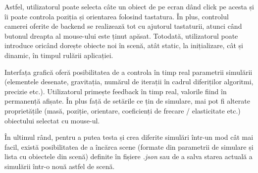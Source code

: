\documentclass[12pt,a4paper]{report}
\begin{document}
Astfel, utilizatorul poate selecta câte un obiect de pe ecran dând click pe acesta și îi poate controla poziția și orientarea folosind tastatura. În plus, controlul camerei oferite de backend se realizează tot cu ajutorul tastaturii, atunci când butonul dreapta al mouse-ului este ținut apăsat. Totodată, utilizatorul poate introduce oricând dorește obiecte noi în scenă, atât static, la inițializare, cât și dinamic, în timpul rulării aplicației.

Interfața grafică oferă posibilitatea de a controla în timp real parametrii simulării (elementele desenate, gravitația, numărul de iterații în cadrul diferiților algoritmi, precizie etc.). Utilizatorul primește feedback în timp real, valorile fiind în permanență afișate. În plus față de setările ce țin de simulare, mai pot fi alterate proprietățile (masă, poziție, orientare, coeficienți de frecare / elasticitate etc.) obiectului selectat cu mouse-ul.

În ultimul rând, pentru a putea testa și crea diferite simulări într-un mod cât mai facil, există posibilitatea de a încărca scene (formate din parametrii de simulare și lista cu obiectele din scenă) definite în fișiere \textit{.json} sau de a salva starea actuală a simulării într-o nouă astfel de scenă.
\end{document}
